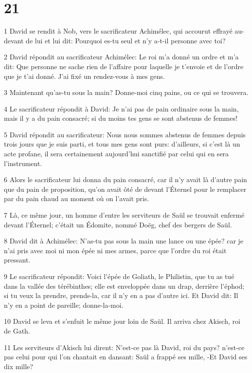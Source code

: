 \chapter{21}

\par 1 David se rendit à Nob, vers le sacrificateur Achimélec, qui accourut effrayé au-devant de lui et lui dit: Pourquoi es-tu seul et n'y a-t-il personne avec toi?
\par 2 David répondit au sacrificateur Achimélec: Le roi m'a donné un ordre et m'a dit: Que personne ne sache rien de l'affaire pour laquelle je t'envoie et de l'ordre que je t'ai donné. J'ai fixé un rendez-vous à mes gens.
\par 3 Maintenant qu'as-tu sous la main? Donne-moi cinq pains, ou ce qui se trouvera.
\par 4 Le sacrificateur répondit à David: Je n'ai pas de pain ordinaire sous la main, mais il y a du pain consacré; si du moins tes gens se sont abstenus de femmes!
\par 5 David répondit au sacrificateur: Nous nous sommes abstenus de femmes depuis trois jours que je suis parti, et tous mes gens sont purs: d'ailleurs, si c'est là un acte profane, il sera certainement aujourd'hui sanctifié par celui qui en sera l'instrument.
\par 6 Alors le sacrificateur lui donna du pain consacré, car il n'y avait là d'autre pain que du pain de proposition, qu'on avait ôté de devant l'Éternel pour le remplacer par du pain chaud au moment où on l'avait pris.
\par 7 Là, ce même jour, un homme d'entre les serviteurs de Saül se trouvait enfermé devant l'Éternel; c'était un Édomite, nommé Doëg, chef des bergers de Saül.
\par 8 David dit à Achimélec: N'as-tu pas sous la main une lance ou une épée? car je n'ai pris avec moi ni mon épée ni mes armes, parce que l'ordre du roi était pressant.
\par 9 Le sacrificateur répondit: Voici l'épée de Goliath, le Philistin, que tu as tué dans la vallée des térébinthes; elle est enveloppée dans un drap, derrière l'éphod; si tu veux la prendre, prends-la, car il n'y en a pas d'autre ici. Et David dit: Il n'y en a point de pareille; donne-la-moi.
\par 10 David se leva et s'enfuit le même jour loin de Saül. Il arriva chez Akisch, roi de Gath.
\par 11 Les serviteurs d'Akisch lui dirent: N'est-ce pas là David, roi du pays? n'est-ce pas celui pour qui l'on chantait en dansant: Saül a frappé ses mille, -Et David ses dix mille?
